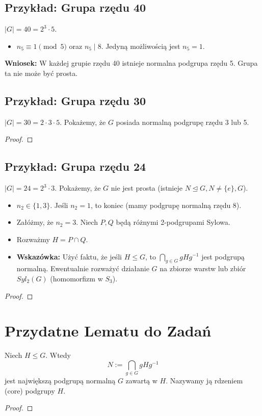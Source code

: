 \subsection{Przykład: Grupa rzędu 40}
$|G| = 40 = 2^3 \cdot 5$.
\begin{itemize}
    \item $n_5 \equiv 1 \pmod 5$ oraz $n_5 \mid 8$. Jedyną możliwością jest $n_5 = 1$.
\end{itemize}
\textbf{Wniosek:} W każdej grupie rzędu 40 istnieje normalna podgrupa rzędu 5. Grupa ta nie może być prosta.

\subsection{Przykład: Grupa rzędu 30}
$|G| = 30 = 2 \cdot 3 \cdot 5$.
Pokażemy, że $G$ posiada normalną podgrupę rzędu 3 lub 5.
\begin{proof}
\end{proof}

\subsection{Przykład: Grupa rzędu 24}
$|G| = 24 = 2^3 \cdot 3$.
Pokażemy, że $G$ nie jest prosta (istnieje $N \unlhd G, N \neq \{e\}, G$).
\begin{itemize}
    \item $n_2 \in \{1, 3\}$. Jeśli $n_2=1$, to koniec (mamy podgrupę normalną rzędu 8).
    \item Załóżmy, że $n_2=3$. Niech $P, Q$ będą różnymi 2-podgrupami Sylowa.
    \item Rozważmy $H = P \cap Q$.
    \item \textbf{Wskazówka:} Użyć faktu, że jeśli $H \le G$, to $\bigcap_{g\in G} gHg^{-1}$ jest podgrupą normalną. Ewentualnie rozważyć działanie $G$ na zbiorze warstw lub zbiór $Syl_2(G)$ (homomorfizm w $S_3$).
\end{itemize}
\begin{proof}
\end{proof}

\section{Przydatne Lematu do Zadań}

\begin{lemma}
    Niech $H \le G$. Wtedy
    \[ N := \bigcap_{g \in G} gHg^{-1} \]
    jest największą podgrupą normalną $G$ zawartą w $H$. Nazywamy ją rdzeniem (core) podgrupy $H$.
\end{lemma}
\begin{proof}
\end{proof}



